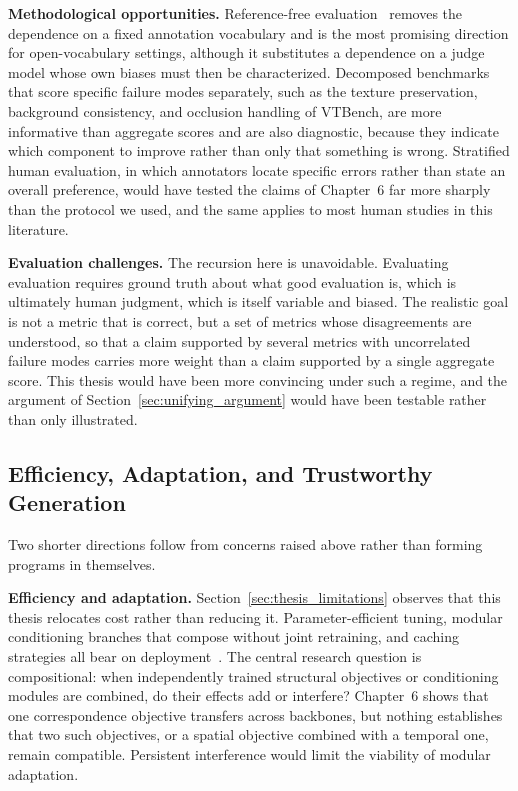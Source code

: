\noindent \textbf{Methodological opportunities.}
Reference-free evaluation~\citep{neau2025measuring} removes the dependence on a fixed annotation vocabulary and is the most promising direction for open-vocabulary settings, although it substitutes a dependence on a judge model whose own biases must then be characterized. Decomposed benchmarks that score specific failure modes separately, such as the texture preservation, background consistency, and occlusion handling of VTBench, are more informative than aggregate scores and are also diagnostic, because they indicate which component to improve rather than only that something is wrong. Stratified human evaluation, in which annotators locate specific errors rather than state an overall preference, would have tested the claims of Chapter~6 far more sharply than the protocol we used, and the same applies to most human studies in this literature.

\noindent \textbf{Evaluation challenges.}
The recursion here is unavoidable. Evaluating evaluation requires ground truth about what good evaluation is, which is ultimately human judgment, which is itself variable and biased. The realistic goal is not a metric that is correct, but a set of metrics whose disagreements are understood, so that a claim supported by several metrics with uncorrelated failure modes carries more weight than a claim supported by a single aggregate score. This thesis would have been more convincing under such a regime, and the argument of Section~\ref{sec:unifying_argument} would have been testable rather than only illustrated.

\subsection{Efficiency, Adaptation, and Trustworthy Generation}
Two shorter directions follow from concerns raised above rather than forming programs in themselves.

\noindent \textbf{Efficiency and adaptation.}
Section~\ref{sec:thesis_limitations} observes that this thesis relocates cost rather than reducing it. Parameter-efficient tuning, modular conditioning branches that compose without joint retraining, and caching strategies all bear on deployment~\citep{zhang2023adding, wu2024towards, zhou2025openpsg}. The central research question is compositional: when independently trained structural objectives or conditioning modules are combined, do their effects add or interfere? Chapter~6 shows that one correspondence objective transfers across backbones, but nothing establishes that two such objectives, or a spatial objective combined with a temporal one, remain compatible. Persistent interference would limit the viability of modular adaptation.

